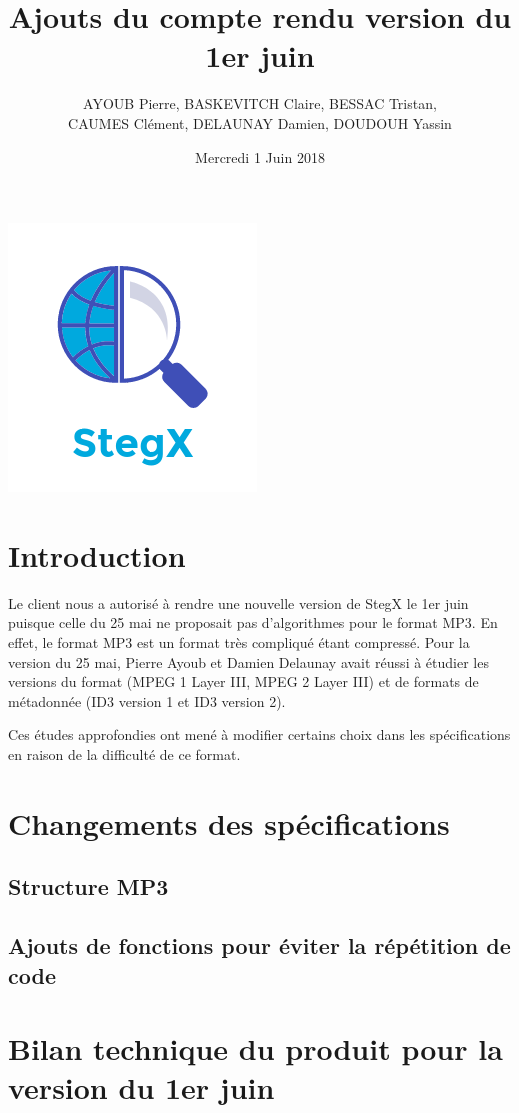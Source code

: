 \documentclass[11pt]{article}
\title{\huge{\textbf Ajouts du compte rendu version du 1{er} juin}}
\author{AYOUB Pierre, BASKEVITCH Claire, BESSAC Tristan, \\
CAUMES Clément, DELAUNAY Damien, DOUDOUH Yassin}
\date{Mercredi 1 Juin 2018}
\begin{document}
\maketitle
\vspace{20em}
\begin{center}\includegraphics{pictures/Application.png}\end{center}
\newpage

\section{Introduction}

Le client nous a autorisé à rendre une nouvelle version de StegX le 1er
juin puisque celle du 25 mai ne proposait pas d'algorithmes pour le format 
MP3. En effet, le format MP3 est un format très compliqué étant compressé. 
Pour la version du 25 mai, Pierre Ayoub et Damien Delaunay avait réussi à 
étudier les versions du format (MPEG 1 Layer III, MPEG 2 Layer III) et de 
formats de métadonnée (ID3 version 1 et ID3 version 2). 

Ces études approfondies ont mené à modifier certains choix dans les spécifications 
en raison de la difficulté de ce format. 

\section{Changements des spécifications}

\subsection{Structure MP3}

\subsection{Ajouts de fonctions pour éviter la répétition de code}

\section{Bilan technique du produit pour la version du 1er juin}
\end{document}
